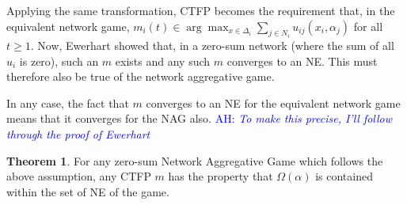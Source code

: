\documentclass{article}
\theoremstyle{definition}
\newtheorem{theorem}{Theorem}
\newcommand{\ah}[1]{\textcolor{blue}{AH: \textit{#1}}}
\begin{document}
	Applying the same transformation, CTFP becomes the requirement that, in the equivalent network game, $m_i(t) \in \arg \max_{x \in \Delta_i} \sum_{j \in N_i} u_{ij}(x_i, \alpha_j)$ for all $t \geq 1$. Now, Ewerhart showed that, in a zero-sum network (where the sum of all $u_i$ is zero), such an $m$ exists and any such $m$ converges to an NE. This must therefore also be true of the network aggregative game.
	
	In any case, the fact that $m$ converges to an NE for the equivalent network game means that it converges for the NAG also. \ah{To make this precise, I'll follow through the proof of Ewerhart}
	
	\begin{theorem}
		For any zero-sum Network Aggregative Game which follows the above assumption, any CTFP $m$ has the property that $\Omega(\alpha)$ is contained within the set of NE of the game.
	\end{theorem}
	
\end{document}
